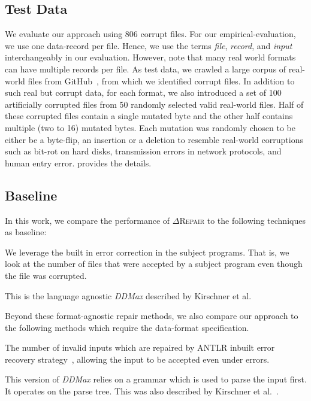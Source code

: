 \documentclass[acmsmall,screen,review,anonymous]{acmart}
\newcommand{\approach}{\textsc{$\Delta$Repair}\xspace}
\newcommand{\ddmax}{\textit{DDMax}\xspace}
\newcommand{\drepair}{\approach}
\begin{document}
\subsection{Test Data} 


We evaluate our approach using 806 corrupt files.
For our empirical-evaluation, we use one data-record per file. Hence, we use
the terms \emph{file}, \emph{record}, and \emph{input} interchangeably in our evaluation.
However, note that many real world formats can have multiple records per file.
As test data, we crawled a large corpus of real-world files
from GitHub~\cite{githubapi}, from which we identified corrupt files. 
In addition to such real but corrupt data, for each format,
we also introduced a set of 100 artificially corrupted files
from 50 randomly selected valid real-world files.
Half of these corrupted files contain a single mutated byte and the other half
contains multiple (two to 16) mutated bytes.
Each mutation was randomly chosen to be either be a byte-flip, an insertion or a
deletion to resemble real-world corruptions such as bit-rot on hard disks,
transmission errors in network protocols, and human entry error.
 provides the details.

\subsection{Baseline}
In this work, we compare the performance of \drepair to the following
techniques as baseline:
\begin{description}[wide]
\item[\textbf{(1) Basic:}] We leverage the built in
  error correction in the subject programs.
  That is, we look at the number of files that were accepted by a
  subject program even though the file was corrupted.

\item[\textbf{(2) Lexical \ddmax:}] This is the language agnostic \ddmax described by Kirschner et al.~\cite{kirschner2020debugging}
\end{description}

Beyond these format-agnostic repair methods, we also compare our approach to
the following methods which require the data-format specification.

\begin{description}[wide]
\item[\textbf{(3) ANTLR:}] The number of invalid inputs which are repaired
by ANTLR inbuilt error recovery strategy~\cite{parr2013definitive}, allowing the
input to be accepted even under errors.


\item[\textbf{(4) Syntactic \ddmax:}] This version of \ddmax relies on a grammar which is used to parse the
  input first. It operates on the parse tree. This was also described by Kirschner et al.~\cite{kirschner2020debugging}.

\end{description}
\end{document}
